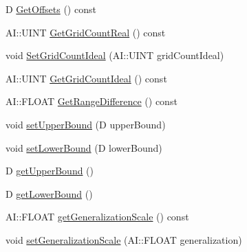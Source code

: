 \begin{DoxyCompactItemize}
\item 
D \hyperlink{classAI_1_1Algorithm_1_1DimensionInfo_a20db996bd27cf32c94fa1365546bde98}{Get\-Offsets} () const 
\item 
A\-I\-::\-U\-I\-N\-T \hyperlink{classAI_1_1Algorithm_1_1DimensionInfo_a06b80f631364311d2e731ea6646a2232}{Get\-Grid\-Count\-Real} () const 
\item 
void \hyperlink{classAI_1_1Algorithm_1_1DimensionInfo_a44578552f80f0772396bdc0430059e9e}{Set\-Grid\-Count\-Ideal} (A\-I\-::\-U\-I\-N\-T grid\-Count\-Ideal)
\item 
A\-I\-::\-U\-I\-N\-T \hyperlink{classAI_1_1Algorithm_1_1DimensionInfo_a6f6590d1d331c55ff424196a16232d94}{Get\-Grid\-Count\-Ideal} () const 
\item 
A\-I\-::\-F\-L\-O\-A\-T \hyperlink{classAI_1_1Algorithm_1_1DimensionInfo_ac00dab53a32a43aca17dcb48d8109436}{Get\-Range\-Difference} () const 
\item 
void \hyperlink{classAI_1_1Algorithm_1_1DimensionInfo_a9889cad59dddd038f7fbddbd2ac6ece4}{set\-Upper\-Bound} (D upper\-Bound)
\item 
void \hyperlink{classAI_1_1Algorithm_1_1DimensionInfo_adef1b2721242ef4ca4978a1ceb8d2474}{set\-Lower\-Bound} (D lower\-Bound)
\item 
D \hyperlink{classAI_1_1Algorithm_1_1DimensionInfo_a01eab7ae14a0653b6042afc93ec988c5}{get\-Upper\-Bound} ()
\item 
D \hyperlink{classAI_1_1Algorithm_1_1DimensionInfo_a21bdf660f342425445db64a1dea1fc2f}{get\-Lower\-Bound} ()
\item 
A\-I\-::\-F\-L\-O\-A\-T \hyperlink{classAI_1_1Algorithm_1_1DimensionInfo_a82de90c2830def513911e4a3135ac2e2}{get\-Generalization\-Scale} () const 
\item 
void \hyperlink{classAI_1_1Algorithm_1_1DimensionInfo_a53462f78d4d95d27ccb421f519b3112a}{set\-Generalization\-Scale} (A\-I\-::\-F\-L\-O\-A\-T generalization)
\end{DoxyCompactItemize}


